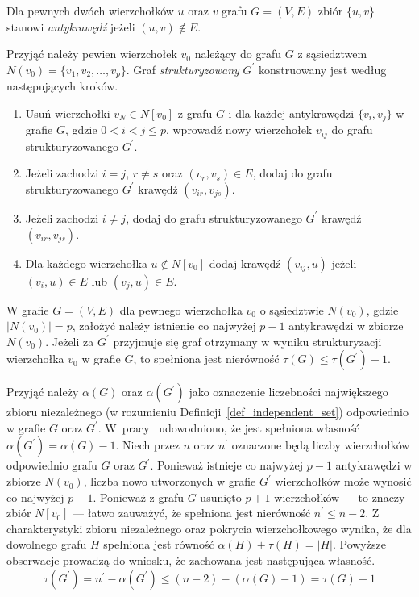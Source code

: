 \par{
  \begin{definition}
    Dla pewnych dwóch wierzchołków $u$ oraz $v$ grafu $G=(V, E)$ zbiór $\{u, v\}$ stanowi \emph{antykrawędź} jeżeli $(u, v) \notin E$.
  \end{definition}

  Przyjąć należy pewien wierzchołek $v_0$ należący do grafu $G$ z sąsiedztwem $N(v_0)=\{v_1, v_2, \ldots, v_p\}$.
  Graf \emph{strukturyzowany} $G^\prime$ konstruowany jest według następujących kroków.
  \begin{enumerate}
    \item Usuń wierzchołki $v_N \in N[v_0]$ z grafu $G$ i dla każdej antykrawędzi $\{v_i, v_j\}$ w grafie $G$, gdzie $0 < i < j \leq p$, wprowadź nowy wierzchołek $v_{ij}$ do grafu strukturyzowanego $G^\prime$.
    \item Jeżeli zachodzi $i=j$, $r\neq s$ oraz $(v_r, v_s) \in E$, dodaj do grafu strukturyzowanego $G^\prime$ krawędź $(v_{ir}, v_{js})$.
    \item Jeżeli zachodzi $i \neq j$, dodaj do grafu strukturyzowanego $G^\prime$ krawędź $(v_{ir}, v_{js})$.
    \item Dla każdego wierzchołka $u \notin N[v_0]$ dodaj krawędź $(v_{ij}, u)$ jeżeli $(v_i, u) \in E$ lub $(v_j, u) \in E$.
  \end{enumerate}
  \begin{theorem}
    W grafie $G=(V, E)$ dla pewnego wierzchołka $v_0$ o sąsiedztwie $N(v_0)$, gdzie $|N(v_0)|=p$, założyć należy istnienie co najwyżej $p-1$ antykrawędzi w zbiorze $N(v_0)$.
    Jeżeli za $G^\prime$ przyjmuje się graf otrzymany w wyniku strukturyzacji wierzchołka $v_0$ w grafie $G$, to spełniona jest nierówność $\tau(G) \leq \tau(G^\prime) - 1$.
  \end{theorem}
  \begin{bproof}
    Przyjąć należy $\alpha(G)$ oraz $\alpha(G^\prime)$ jako oznaczenie liczebności największego zbioru niezależnego (w rozumieniu Definicji~\ref{def_independent_set}) odpowiednio w grafie $G$ oraz $G^\prime$.
    W~pracy~\cite{Ebengger:1984} udowodniono, że jest spełniona własność $\alpha(G^\prime)=\alpha(G) - 1$.
    Niech przez $n$ oraz $n^\prime$ oznaczone będą liczby wierzchołków odpowiednio grafu $G$ oraz $G^\prime$.
    Ponieważ istnieje co najwyżej $p - 1$ antykrawędzi w zbiorze $N(v_0)$, liczba nowo utworzonych w grafie $G^\prime$ wierzchołków może wynosić co najwyżej $p - 1$.
    Ponieważ z grafu $G$ usunięto $p+1$ wierzchołków --- to znaczy zbiór $N[v_0]$ --- łatwo zauważyć, że spełniona jest nierówność $n^\prime \leq n-2$.
    Z charakterystyki zbioru niezależnego oraz pokrycia wierzchołkowego wynika, że dla dowolnego grafu $H$ spełniona jest równość $\alpha(H)+\tau(H)=|H|$.
    Powyższe obserwacje prowadzą do wniosku, że zachowana jest następująca własność.
    \[\tau(G^\prime)=n^\prime-\alpha(G^\prime)\leq (n-2)-(\alpha(G)-1)=\tau(G)-1\]
  \end{bproof}
}
